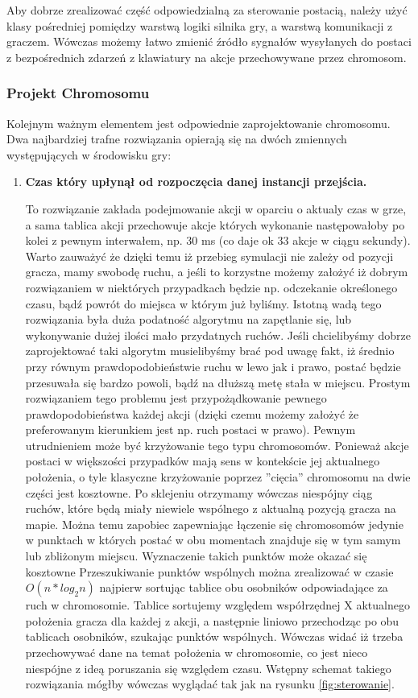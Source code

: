 \begin{par}
	Aby dobrze zrealizować część odpowiedzialną za sterowanie postacią, należy użyć klasy pośredniej pomiędzy warstwą logiki silnika gry, a warstwą komunikacji z graczem. 
	Wówczas możemy łatwo zmienić źródło sygnałów wysyłanych do postaci z bezpośrednich zdarzeń z klawiatury na akcje przechowywane przez chromosom. 
	\subsubsection{Projekt Chromosomu}
	Kolejnym ważnym elementem jest odpowiednie zaprojektowanie chromosomu. 
	Dwa najbardziej trafne rozwiązania opierają się na dwóch zmiennych występujących w środowisku gry:
	\begin{enumerate}
	\item
	{\bf Czas który upłynął od rozpoczęcia danej instancji przejścia. }
	\begin{par}

		To rozwiązanie zakłada podejmowanie akcji w oparciu o aktualy czas w grze, a sama tablica akcji przechowuje akcje których wykonanie następowałoby po kolei z pewnym interwałem, np. 30 ms (co daje ok 33 akcje w ciągu sekundy).
		Warto zauważyć że dzięki temu iż przebieg symulacji nie zależy od pozycji gracza, mamy swobodę ruchu, a jeśli to korzystne możemy założyć iż dobrym rozwiązaniem w niektórych przypadkach będzie np. odczekanie określonego czasu, bądź powrót do miejsca w którym już byliśmy.
		Istotną wadą tego rozwiązania była duża podatność algorytmu na zapętlanie się, lub wykonywanie dużej ilości mało przydatnych ruchów. 
		Jeśli chcielibyśmy dobrze zaprojektować taki algorytm musielibyśmy brać pod uwagę fakt, iż średnio przy równym prawdopodobieństwie ruchu w lewo jak i prawo, postać będzie przesuwała się bardzo powoli, bądź na dłuższą metę stała w miejscu. Prostym rozwiązaniem tego problemu jest przypożądkowanie pewnego prawdopodobieństwa każdej akcji (dzięki czemu możemy założyć że preferowanym kierunkiem jest np. ruch postaci w prawo).
		Pewnym utrudnieniem może być krzyżowanie tego typu chromosomów. Ponieważ akcje postaci w większości przypadków mają sens w kontekście jej aktualnego położenia, o tyle klasyczne krzyżowanie poprzez ''cięcia'' chromosomu na dwie części jest kosztowne.
		Po sklejeniu otrzymamy wówczas niespójny ciąg ruchów, które będą miały niewiele wspólnego z aktualną pozycją gracza na mapie.
		Można temu zapobiec zapewniając łączenie się chromosomów jedynie w punktach w których postać w obu momentach znajduje się w tym samym lub zbliżonym miejscu. Wyznaczenie takich punktów może okazać się kosztowne
		Przeszukiwanie punktów wspólnych można zrealizować w czasie $O(n*log_2n)$ najpierw sortując tablice obu osobników odpowiadające za ruch w chromosomie. 
		Tablice sortujemy względem współrzędnej X aktualnego położenia gracza dla każdej z akcji, a następnie liniowo przechodząc po obu tablicach osobników, szukając punktów wspólnych.
		Wówczas widać iż trzeba przechowywać dane na temat położenia w chromosomie, co jest nieco niespójne z ideą poruszania się względem czasu.
		Wstępny schemat takiego rozwiązania mógłby wówczas wyglądać tak jak na rysunku \ref{fig:sterowanie}.
		

\end{par}
\end{enumerate}
\end{par}
